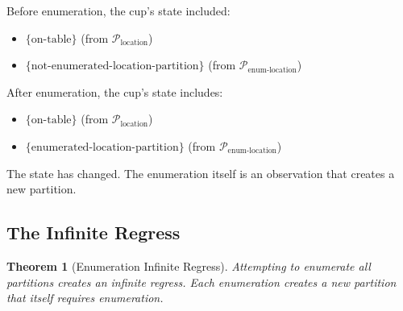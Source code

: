 \documentclass[twocolumn,10pt]{article}
\newtheorem{theorem}{Theorem}[section]
\theoremstyle{definition}
\theoremstyle{remark}
\begin{document}
Before enumeration, the cup's state included:
\begin{itemize}
\item $\{\text{on-table}\}$ (from $\mathcal{P}_{\text{location}}$)
\item $\{\text{not-enumerated-location-partition}\}$ (from $\mathcal{P}_{\text{enum-location}}$)
\end{itemize}

After enumeration, the cup's state includes:
\begin{itemize}
\item $\{\text{on-table}\}$ (from $\mathcal{P}_{\text{location}}$)
\item $\{\text{enumerated-location-partition}\}$ (from $\mathcal{P}_{\text{enum-location}}$)
\end{itemize}

The state has changed. The enumeration itself is an observation that creates a new partition.

\subsection{The Infinite Regress}

\begin{theorem}[Enumeration Infinite Regress]
\label{thm:enumeration_regress}
Attempting to enumerate all partitions creates an infinite regress. Each enumeration creates a new partition that itself requires enumeration.
\end{theorem}
\end{document}
